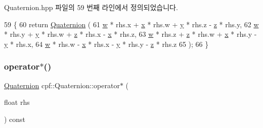 Quaternion.\+hpp 파일의 59 번째 라인에서 정의되었습니다.


\begin{DoxyCode}
59                                                           \{
60             \textcolor{keywordflow}{return} \hyperlink{classcpf_1_1_quaternion_aae3cc98fcdb7a419a29db4ee988972bc}{Quaternion} (
61                     \hyperlink{classcpf_1_1_quaternion_af312a196b39bb4903b876bc454ac15f8}{w} * rhs.x + \hyperlink{classcpf_1_1_quaternion_a200f7bce4e673281af8cc7dd75cb0677}{x} * rhs.w + \hyperlink{classcpf_1_1_quaternion_a4fbade6e58be55a49c94e7f157988136}{y} * rhs.z - \hyperlink{classcpf_1_1_quaternion_ade9c41b717605118e5fdf95d96a843b4}{z} * rhs.y,
62                     \hyperlink{classcpf_1_1_quaternion_af312a196b39bb4903b876bc454ac15f8}{w} * rhs.y + \hyperlink{classcpf_1_1_quaternion_a4fbade6e58be55a49c94e7f157988136}{y} * rhs.w + \hyperlink{classcpf_1_1_quaternion_ade9c41b717605118e5fdf95d96a843b4}{z} * rhs.x - \hyperlink{classcpf_1_1_quaternion_a200f7bce4e673281af8cc7dd75cb0677}{x} * rhs.z,
63                     \hyperlink{classcpf_1_1_quaternion_af312a196b39bb4903b876bc454ac15f8}{w} * rhs.z + \hyperlink{classcpf_1_1_quaternion_ade9c41b717605118e5fdf95d96a843b4}{z} * rhs.w + \hyperlink{classcpf_1_1_quaternion_a200f7bce4e673281af8cc7dd75cb0677}{x} * rhs.y - \hyperlink{classcpf_1_1_quaternion_a4fbade6e58be55a49c94e7f157988136}{y} * rhs.x,
64                     \hyperlink{classcpf_1_1_quaternion_af312a196b39bb4903b876bc454ac15f8}{w} * rhs.w - \hyperlink{classcpf_1_1_quaternion_a200f7bce4e673281af8cc7dd75cb0677}{x} * rhs.x - \hyperlink{classcpf_1_1_quaternion_a4fbade6e58be55a49c94e7f157988136}{y} * rhs.y - \hyperlink{classcpf_1_1_quaternion_ade9c41b717605118e5fdf95d96a843b4}{z} * rhs.z
65             );
66         \}
\end{DoxyCode}
\mbox{\label{classcpf_1_1_quaternion_a248bcc49e9e22d152e8e0dad9b5346da}} 
\subsubsection{\texorpdfstring{operator$\ast$()}{operator*()}\hspace{0.1cm}{\footnotesize\ttfamily [2/2]}}
{\footnotesize\ttfamily \hyperlink{classcpf_1_1_quaternion}{Quaternion} cpf\+::\+Quaternion\+::operator$\ast$ (\begin{DoxyParamCaption}\item[{float}]{rhs }\end{DoxyParamCaption}) const\hspace{0.3cm}{\ttfamily [inline]}}



